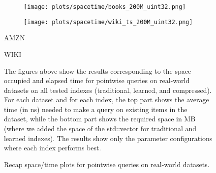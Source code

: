 \documentclass{article}
\begin{document}
\begin{figure}[!htbp]
{\begin{minipage}[t][0.98\textheight][t]{\textwidth}
    \begin{minipage}{0.48\linewidth}
        \begin{figure}[H]
        \texttt{[image: plots/spacetime/books\_200M\_uint32.png]}
        \end{figure}
    \end{minipage}
    \begin{minipage}{0.48\linewidth}
        \begin{figure}[H]
        \texttt{[image: plots/spacetime/wiki\_ts\_200M\_uint32.png]}
        \end{figure}
    \end{minipage}
    \begin{minipage}{0.48\linewidth}
    \begin{center}
        AMZN
    \end{center}
    \end{minipage}
    \begin{minipage}{0.48\linewidth}
    \begin{center}
        WIKI
    \end{center}
    \end{minipage}

    \vfill
    
    \begin{minipage}{\linewidth}
    The figures above show the results corresponding to the space occupied and elapsed time for pointwise queries on real-world datasets on all tested indexes (traditional, learned, and compressed). For each dataset and for each index, the top part shows the average time (in ns) needed to make a query on existing items in the dataset, while the bottom part shows the required space in MB (where we added the space of the std::vector for traditional and learned indexes).  
    The results show only the parameter configurations where each index performs best. 
    \end{minipage}
    \vspace{10px}
\end{minipage}
}
\caption{Recap space/time plots for pointwise queries on real-world datasets.}
\end{figure}
\end{document}
